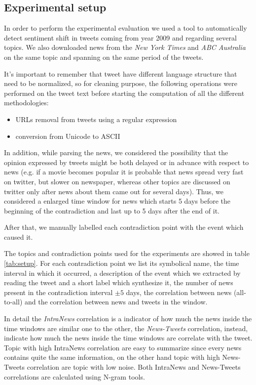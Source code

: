 \subsection*{Experimental setup}
In order to perform the experimental evaluation we used a tool to automatically
detect sentiment shift in tweets coming from year 2009 and regarding several
topics. We also downloaded news from the \emph{New York Times} and \emph{ABC
Australia} on the same topic and spanning on the same period of the tweets.

It's important to remember that tweet have different language structure that need to be normalized, so for cleaning purpose, the following operations were performed on the tweet text before starting the computation of all the different methodologies:
\begin{itemize}
	\item URLs removal from tweets using a regular expression
	\item conversion from Unicode to ASCII
\end{itemize}

In addition, while parsing the news, we considered the possibility that the
opinion expressed by tweets might be both delayed or in advance with respect to
news (e.g. if a movie becomes popular it is probable that news spread very fast
on twitter, but slower on newspaper, whereas other topics are discussed on
twitter only after news about them came out for several days). Thus, we
considered a enlarged time window for news which starts 5 days before the
beginning of the contradiction and last up to 5 days after the end of it.

After that, we manually labelled each contradiction point with the event which
caused it. 

The topics and contradiction points used for the experiments 
are showed in table \ref{tab:setup}. For each contradiction point we list its
symbolical name, the time interval in which it occurred, a description of the event
which we extracted by reading the tweet and a short label which synthesize it,
the number of news present in the contradiction interval $\pm 5$ days,
the correlation between news (all-to-all) and the correlation between news and tweets in the window.

In detail the \emph{IntraNews} correlation is a indicator of how much the news inside the time windows are similar one to the other,
the \emph{News-Tweets} correlation, instead, indicate how much the news inside the time windows are correlate with the tweet.
Topic with high IntraNews correlation are easy to summarize since every news contains quite the same information,
on the other hand topic with high News-Tweets correlation are topic with low noise.
Both IntraNews and News-Tweets  correlations are calculated using N-gram tools.

